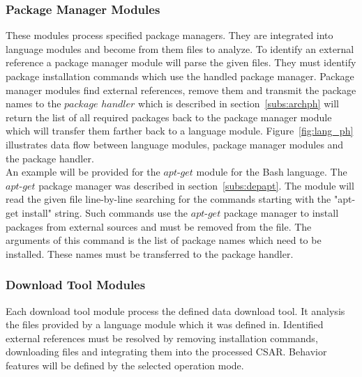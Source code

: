 \subsubsection{Package Manager Modules} \label{subs:archpmm}
These modules process specified package managers.
They are integrated into language modules and become from them files to analyze.
To identify an external reference a package manager module will parse the given files. 
They must identify package installation commands which use the handled package manager.
Package manager modules find external references, remove them and transmit the package names to the $package$ $handler$ which is described in section~\ref{subs:archph} will return the list of all required packages back to the package manager module which will transfer them farther back to a language module.
Figure~\ref{fig:lang_ph} illustrates data flow between language modules, package manager modules and the package handler.\\
An example will be provided for the $apt$-$get$ module for the Bash language.
The $apt$-$get$ package manager was described in section~\ref{subs:depapt}.
The module will read the given file line-by-line searching for the commands starting with the "apt-get install" string.
Such commands use the $apt$-$get$ package manager to install packages from external sources and must be removed from the file.
The arguments of this command is the list of package names which need to be installed.
These names must be transferred to the package handler.


\subsubsection{Download Tool Modules}
Each download tool module process the defined data download tool.
It analysis the files provided by a language module which it was defined in.
Identified external references must be resolved by removing installation commands, downloading files and integrating them into the processed CSAR.
Behavior features will be defined by the selected operation mode.

